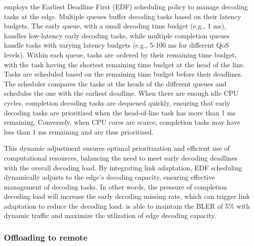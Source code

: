 \Name{} employs the Earliest Deadline First (EDF) scheduling policy to manage decoding tasks at the edge. Multiple queues buffer decoding tasks based on their latency budgets. The early queue, with a small decoding time budget (e.g., 1 ms), handles low-latency early decoding tasks, while multiple completion queues handle tasks with varying latency budgets (e.g., 5-100 ms for different QoS levels). Within each queue, tasks are ordered by their remaining time budget, with the task having the shortest remaining time budget at the head of the line.
Tasks are scheduled based on the remaining time budget before their deadlines. The scheduler compares the tasks at the heads of the different queues and schedules the one with the earliest deadline. When there are enough idle CPU cycles, completion decoding tasks are dequeued quickly, ensuring that early decoding tasks are prioritized when the head-of-line task has more than 1 ms remaining. Conversely, when CPU cores are scarce, completion tasks may have less than 1 ms remaining and are thus prioritized.


This dynamic adjustment ensures optimal prioritization and efficient use of computational resources, balancing the need to meet early decoding deadlines with the overall decoding load. By integrating link adaptation, EDF scheduling dynamically adjusts to the edge's decoding capacity, ensuring effective management of decoding tasks.
In other words, the pressure of completion decoding load will increase the early decoding missing rate, which can trigger link adaptation to reduce the decoding load.
\Name{} is able to maintain the BLER of 5\% with dynamic traffic and maximize the utlization of edge decoding capacity.


\subsubsection{Offloading to remote}
\label{offload}

